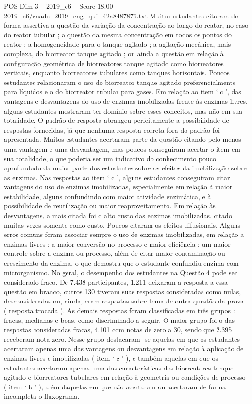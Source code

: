 \begin{textsample}{POS Dim 3 – 2019\_c6 – Score 18.00 – 2019\_c6/enade\_2019\_eng\_qui\_42a8487876.txt}
Muitos estudantes citaram de forma assertiva a questão da variação da concentração ao longo do reator, no caso do reator tubular ; a questão da mesma concentração em todos os pontos do reator ; a homogeneidade para o tanque agitado ; a agitação mecânica, mais complexa, do biorreator tanque agitado ; ou ainda a questão em relação à configuração geométrica de biorreatores tanque agitado como biorreatores verticais, enquanto biorreatores tubulares como tanques horizontais.
Poucos estudantes relacionaram o uso do biorreator tanque agitado preferencialmente para líquidos e o do biorreator tubular para gases.
Em relação ao item ‘ c ’, das vantagens e desvantagens do uso de enzimas imobilizadas frente às enzimas livres, alguns estudantes mostraram ter domínio sobre esses conceitos, mas não em sua totalidade.
O padrão de resposta abrangeu perfeitamente a possibilidade de respostas fornecidas, já que nenhuma resposta correta fora do padrão foi apresentada.
Muitos estudantes acertaram parte da questão citando pelo menos uma vantagem e uma desvantagem, mas poucos conseguiram acertar o item em sua totalidade, o que poderia ser um indicativo do conhecimento pouco aprofundado da maior parte dos estudantes sobre os efeitos da imobilização sobre as enzimas.
Nas respostas ao item ‘ c ’, alguns estudantes conseguiram citar vantagens do uso de enzimas imobilizadas, especialmente em relação à maior estabilidade, alguns confundindo com maior atividade enzimática, e à possibilidade de reutilização ou maior reaproveitamento.
Em relação às desvantagens, a mais citada foi o alto custo das enzimas imobilizadas, citado muitas vezes somente como custo.
Poucos citaram os efeitos difusionais.
Alguns erros comuns foram associar sempre o uso de enzimas imobilizadas, em relação a enzimas livres ; a maior conversão no processo e maior eficiência ; um maior controle sobre a enzima ou processo, além de citar maior contaminação ou crescimento da enzima, o que demostra que o estudante confundiu enzima com microrganismo.
No geral, o desempenho dos estudantes na Questão 4 pode ser considerado fraco.
De 7.438 participantes, 1.211 deixaram a resposta a essa questão em branco, outros 130 tiveram suas respostas consideradas como nulas, desconsideradas ou, ainda, eram respostas sobre tema de outra questão da prova ( resposta trocada ).
As demais respostas foram classificadas em três grupos : fracas, medianas e boas, como discriminado a seguir.
O maior grupo foi o das respostas consideradas fracas, 4.101 com notas de zero a 30, sendo que 2.395 receberam nota zero.
Nesse grupo destacaram -se aquelas em que os estudantes acertaram apenas uma das vantagens ou desvantagens em relação à aplicação de enzimas livres e imobilizadas ( item ‘ c ’ ), e também aquelas em que os estudantes acertaram apenas uma das características dos biorreatores tanque agitado e biorreatores tubulares em relação à geometria ou condições de processo ( item ‘ b ’ ), além daquelas em que não acertaram ou acertaram de forma incompleta o fluxograma.

\end{textsample}

